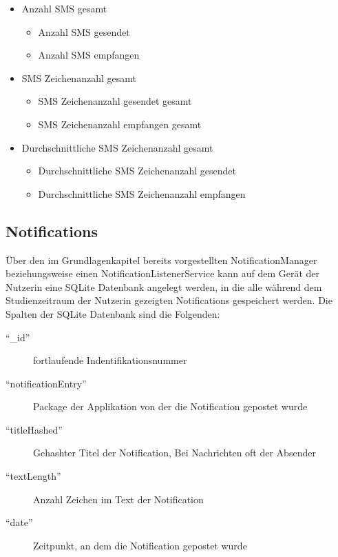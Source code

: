 \begin{itemize}
    \item Anzahl SMS gesamt
    \begin{itemize}
        \item Anzahl SMS gesendet
        \item Anzahl SMS empfangen
    \end{itemize}

    \item SMS Zeichenanzahl gesamt
    \begin{itemize}
        \item SMS Zeichenanzahl gesendet gesamt
        \item SMS Zeichenanzahl empfangen gesamt
    \end{itemize}

    \item Durchschnittliche SMS Zeichenanzahl gesamt
    \begin{itemize}
        \item Durchschnittliche SMS Zeichenanzahl gesendet
        \item Durchschnittliche SMS Zeichenanzahl empfangen
    \end{itemize}

\end{itemize}


\subsection{Notifications}


Über den im Grundlagenkapitel bereits vorgestellten NotificationManager beziehungsweise einen NotificationListenerService kann auf dem Gerät der Nutzerin eine SQLite Datenbank angelegt werden,
in die alle während dem Studienzeitraum der Nutzerin gezeigten Notifications gespeichert werden.
Die Spalten der SQLite Datenbank sind die Folgenden:
\begin{description}
    \item ["`\_id"'] fortlaufende Indentifikationsnummer
    \item ["`notificationEntry"'] Package der Applikation von der die Notification gepostet wurde
    \item ["`titleHashed"'] Gehashter Titel der Notification, Bei Nachrichten oft der Absender
    \item ["`textLength"'] Anzahl Zeichen im Text der Notification
    \item ["`date"'] Zeitpunkt, an dem die Notification gepostet wurde
\end{description}

